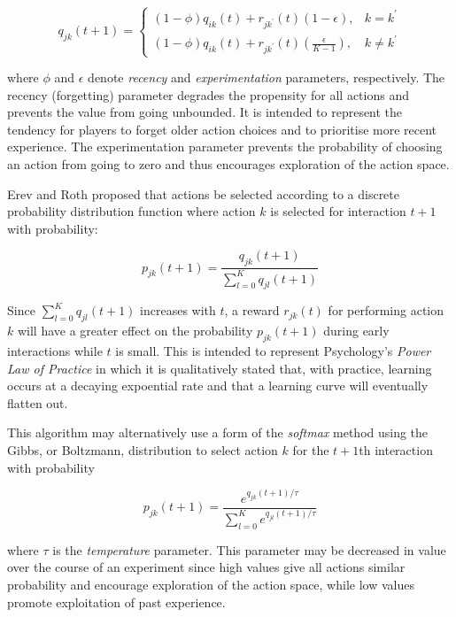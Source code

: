 \begin{equation}
q_{jk}(t+1) =
\begin{cases}
(1-\phi)q_{ik}(t) + r_{jk^\prime}(t)(1-\epsilon), & \text{$k = k^\prime$} \\
(1-\phi)q_{ik}(t) + r_{jk^\prime}(t)(\frac{\epsilon}{K-1}), & \text{$k \ne
k^\prime$}
\end{cases}
\end{equation}

where $\phi$ and $\epsilon$ denote \textit{recency} and
\textit{experimentation} parameters, respectively. The recency (forgetting)
parameter degrades the propensity for all actions and prevents the value from
going unbounded.  It is intended to represent the tendency for players to
forget older action choices and to prioritise more recent experience.  The
experimentation parameter prevents the probability of choosing an action from
going to zero and thus encourages exploration of the action space.

Erev and Roth proposed that actions be selected according to a discrete
probability distribution function where action $k$ is selected for interaction
$t+1$ with probability:

\begin{equation}
p_{jk}(t+1) = \frac{q_{jk}(t+1)}{\sum_{l=0}^K q_{jl}(t+1)}
\end{equation}

Since $\sum_{l=0}^K q_{jl}(t+1)$ increases with $t$, a reward $r_{jk}(t)$ for
performing action $k$ will have a greater effect on the probability
$p_{jk}(t+1)$ during early interactions while $t$ is small.  This is intended
to represent Psychology's \textit{Power Law of Practice} in which it is
qualitatively stated that, with practice, learning occurs at a decaying
expoential rate and that a learning curve will eventually flatten out.

This algorithm may alternatively use a form of the \textit{softmax} method
\cite{suttonbarto:1998} using the Gibbs, or Boltzmann, distribution to select
action $k$ for the $t+1$th interaction with probability

\begin{equation}
p_{jk}(t+1) = \frac{e^{q_{jk}(t+1)/\tau}}{\sum_{l=0}^K e^{q_{jl}(t+1)/\tau}}
\end{equation}

where $\tau$ is the \textit{temperature} parameter.  This parameter may be
decreased in value over the course of an experiment since high values give all
actions similar probability and encourage exploration of the action space,
while low values promote exploitation of past experience.

